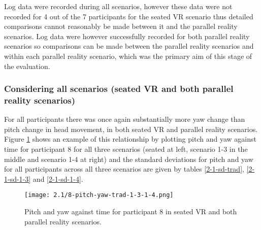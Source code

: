 Log data were recorded during all scenarios, however these data were not recorded for 4 out of the 7 participants for the seated VR scenario thus detailed comparisons cannot reasonably be made between it and the parallel reality scenarios. Log data were however successfully recorded for both parallel reality scenarios so comparisons can be made between the parallel reality scenarios and within each parallel reality scenario, which was the primary aim of this stage of the evaluation.


\subsubsection{Considering all scenarios (seated VR and both parallel reality scenarios)}

For all participants there was once again substantially more yaw change than pitch change in head movement, in both seated VR and parallel reality scenarios. Figure \ref{2-1-8-pitch-yaw-trad-1-3-1-4.png} shows an example of this relationship by plotting pitch and yaw against time for participant 8 for all three scenarios (seated at left, scenario 1-3 in the middle and scenario 1-4 at right) and the standard deviations for pitch and yaw for all participants across all three scenarios are given by tables \ref{2-1-sd-trad}, \ref{2-1-sd-1-3} and \ref{2-1-sd-1-4}.

\begin{figure}
	\begin{center}
	\texttt{[image: 2.1/8-pitch-yaw-trad-1-3-1-4.png]}
	\caption{Pitch and yaw against time for participant 8 in seated VR and both parallel reality scenarios.}
	\label{2-1-8-pitch-yaw-trad-1-3-1-4.png}
	\end{center}
\end{figure}

